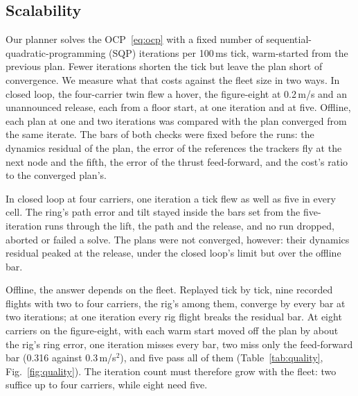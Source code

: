 \subsection{Scalability}
\label{sec:res_scale}

Our planner solves the OCP~\eqref{eq:ocp} with a fixed number of sequential-quadratic-programming (SQP) iterations
per 100\,ms tick, warm-started from the previous plan. Fewer iterations shorten the tick but leave the plan short of
convergence. We measure what that costs against the fleet size in two ways. In closed loop, the four-carrier twin
flew a hover, the figure-eight at 0.2\,m/s and an unannounced release, each from a floor start, at one iteration and
at five. Offline, each plan at one and two iterations was compared with the plan converged from the same iterate. The
bars of both checks were fixed before the runs: the dynamics residual of the plan, the error of the references the
trackers fly at the next node and the fifth, the error of the thrust feed-forward, and the cost's ratio to the
converged plan's.

In closed loop at four carriers, one iteration a tick flew as well as five in every cell. The ring's path error and
tilt stayed inside the bars set from the five-iteration runs through the lift, the path and the release, and no run
dropped, aborted or failed a solve. The plans were not converged, however: their dynamics residual peaked at the
release, under the closed loop's limit but over the offline bar.

Offline, the answer depends on the fleet. Replayed tick by tick, nine recorded flights with two to four carriers, the
rig's among them, converge by every bar at two iterations; at one iteration every rig flight breaks the residual bar.
At eight carriers on the figure-eight, with each warm start moved off the plan by about the rig's ring error, one
iteration misses every bar, two miss only the feed-forward bar (0.316 against 0.3\,m/s$^2$), and five pass all of
them (Table~\ref{tab:quality}, Fig.~\ref{fig:quality}). The iteration count must therefore grow with the fleet: two
suffice up to four carriers, while eight need five.

